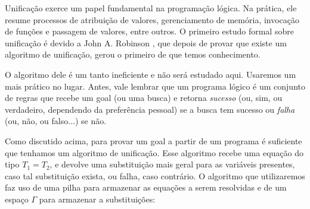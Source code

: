 \documentclass{article}
\theoremstyle{remark}
\theoremstyle{theorem}
\begin{document}
Unificação exerce um papel fundamental na programação lógica. Na prática, ele resume processos de atribuição de valores, gerenciamento de memória, invocação de funções e passagem de valores, entre outros. O primeiro estudo formal sobre unificação é devido a John A. Robinson \cite{robinson}, que depois de provar que existe um algoritmo de unificação, gerou o primeiro de que temos conhecimento. %

O algoritmo dele é um tanto ineficiente e não será estudado aqui. Usaremos um mais prático no lugar. Antes, vale lembrar que um programa lógico é um conjunto de regras que recebe um goal (ou uma busca) e retorna {\it sucesso} (ou, sim, ou verdadeiro, dependendo da preferência pessoal) se a busca tem sucesso ou {\it falha} (ou, não, ou falso...) se não.

Como discutido acima, para provar um goal a partir de um programa é suficiente que tenhamos um algoritmo de unificação. Esse algoritmo recebe uma equação do tipo $T_1 = T_2$, e devolve uma substituição mais geral %
para as variáveis presentes, caso tal substituição exista, ou falha, caso contrário. O algoritmo que utilizaremos faz uso de uma pilha para armazenar as equações a serem resolvidas e de um espaço
$\Gamma$ para armazenar a substituições:
\end{document}
